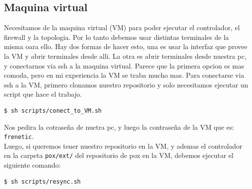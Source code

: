 \subsection{Maquina virtual}
	Necesitamos de la maquina virtual (VM) para poder ejecutar el controlador, el firewall y la topologia. Por lo tanto debemos usar 		distintas terminales de la misma oara ello. Hay dos formas de hacer esto, una es usar la interfaz que provee la VM y abrir terminales 		desde alli. La otra es abrir terminales desde nuestra pc, y conectarnos via ssh a la maquina virtual. Parece que la primera opcion es 		mas comoda, pero en mi experiencia la VM se traba mucho mas.
	Para conectarse via ssh a la VM, primero clonamos nuestro repositorio y solo necesitamos ejecutar un script que hace el trabajo.
	\begin{lstlisting}[language=bash,numbers=none]
	 	$ sh scripts/conect_to_VM.sh
	\end{lstlisting}	
	Nos pedira la cotraseña de nuetra pc, y luego la contraseña de la VM que es: \lstinline[columns=fixed]{frenetic}.\\
	Luego, si queremos tener nuestro repositorio en la VM, y ademas el controlador en la carpeta \lstinline[columns=fixed]{pox/ext/} del 		repositorio de pox en la VM, debemos ejecutar el siguiente comando:\\
	\begin{lstlisting}[language=bash,numbers=none]
		$ sh scripts/resync.sh
	\end{lstlisting}
